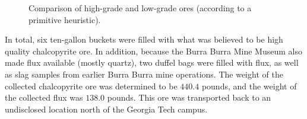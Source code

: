 \begin{figure}[htb]

\caption{Comparison of high-grade and low-grade ores (according to a primitive
heuristic).}
\label{fig:ore-comparison}

\end{figure}

In total, six ten-gallon buckets were filled with what was believed to be high
quality chalcopyrite ore.  In addition, because the Burra Burra Mine Museum also
made flux available (mostly quartz), two duffel bags were filled with flux, as
well as slag samples from earlier Burra Burra mine operations.  The weight of
the collected chalcopyrite ore was determined to be $440.4$ pounds, and the
weight of the collected flux was $138.0$ pounds.  This ore was transported back
to an undisclosed location north of the Georgia Tech campus.
